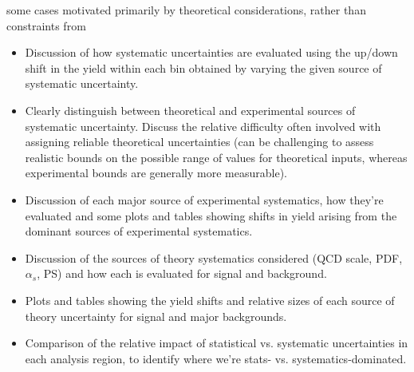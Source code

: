  some cases motivated primarily by theoretical considerations, rather than constraints from 


\begin{itemize}
\item Discussion of how systematic uncertainties are evaluated using the up/down shift in the yield within each bin obtained by varying the given source of systematic uncertainty.  
\item Clearly distinguish between theoretical and experimental sources of systematic uncertainty. Discuss the relative difficulty often involved with assigning reliable theoretical uncertainties (can be challenging to assess realistic bounds on the possible range of values for theoretical inputs, whereas experimental bounds are generally more measurable). 
\item Discussion of each major source of experimental systematics, how they're evaluated and some plots and tables showing shifts in yield arising from the dominant sources of experimental systematics.
\item Discussion of the sources of theory systematics considered (QCD scale, PDF, $\alpha_s$, PS) and how each is evaluated for signal and background.
\item Plots and tables showing the yield shifts and relative sizes of each source of theory uncertainty for signal and major backgrounds.
\item Comparison of the relative impact of statistical vs. systematic uncertainties in each analysis region, to identify where we're stats- vs. systematics-dominated.
\end{itemize}